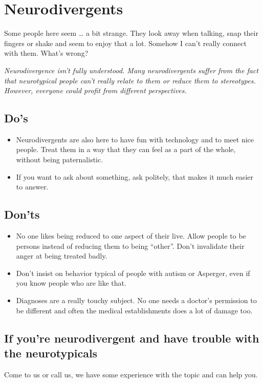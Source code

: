 \documentclass[10pt]{leaflet}
\begin{document}
\section{Neurodivergents}
\label{sec-3}
Some people here seem \ldots{} a bit strange. They look away when
talking, snap their fingers or shake and seem to enjoy that a
lot. Somehow I can't really connect with them. What's wrong?


\emph{Neurodivergence isn't fully understood. Many neurodivergents
  suffer from the fact that neurotypical people can't really relate to
  them or reduce them to stereotypes. However, everyone could profit
  from different perspectives.}

\subsection{Do's}
\label{sec-3-1}
\begin{itemize}
\item Neurodivergents are also here to have fun with technology and to
  meet nice people. Treat them in a way that they can feel as a part
  of the whole, without being paternalistic.
\item If you want to ask about something, ask politely, that makes it
  much easier to answer. 
\end{itemize}

\subsection{Don'ts}
\label{sec-3-2}
\begin{itemize}
\item No one likes being reduced to one aspect of their live. Allow
  people to be persons instead of reducing them to being ``other''.
  Don't invalidate their anger at being treated badly.
\item Don't insist on behavior typical of people with autism or
  Asperger, even if you know people who are like that.
\item Diagnoses are a really touchy subject. No one needs a doctor's
  permission to be different and often the medical establishments does
  a lot of damage too.
\end{itemize}

\subsection{If you're neurodivergent and have trouble with the neurotypicals}
Come to us or call us, we have some experience with the topic and can
help you.\\ \\
\end{document}
